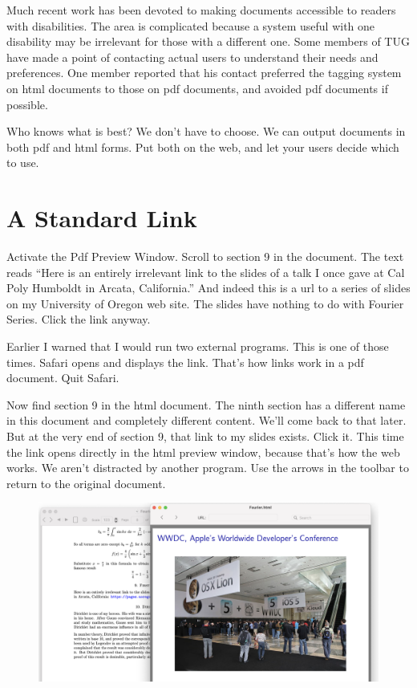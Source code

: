 \documentclass[11pt, oneside]{article}   	%
\begin{document}
Much recent work has been devoted to making documents accessible to readers with disabilities. The area is complicated because a system useful with one disability may be irrelevant for those with a different one. Some members of TUG have made a point of contacting actual users to understand their needs and preferences. One member reported that his contact preferred the tagging system on html documents to those on pdf documents, and avoided pdf documents if possible.

Who knows what is best? We don't have to choose. We can output documents in both pdf and html forms. Put both on the web, and let your users decide which to use.

\section{A Standard Link}

Activate the Pdf Preview Window. Scroll to section 9 in the document. The text reads ``Here is an entirely irrelevant link to the slides of a talk I once gave at Cal Poly Humboldt in Arcata, California.'' And indeed this is a url to a series of slides on my University of Oregon web site. The slides have nothing to do with Fourier Series. Click the link anyway.

Earlier I warned that I would run two external programs. This is one of those times.  Safari opens and displays the link. That's how links work in a pdf document. Quit Safari. 

Now find section 9 in the html document. The ninth section has a different name in this document and completely different content. We'll come back to that later. But at the very end of section 9, that link to my slides exists. Click it. This time the link opens directly in the html preview window, because that's how the web works. We aren't distracted by another program. Use the arrows in the toolbar to return to the original document.
\quad
\begin{figure}[htbp] %
     \includegraphics[width=6.8in.]{Graphics/shot3.png} %
   \label{fig:example}
\end{figure}
\end{document}
